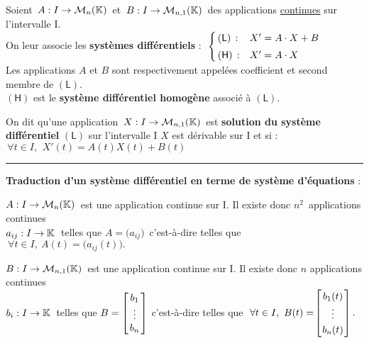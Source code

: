 \vspace{1.7cm}

Soient \(\,A:I\to \mathcal{M}_n(\mathbb{K})\,\) et \(\,B:I\to \mathcal{M}_{n,1}(\mathbb{K})\,\) des applications \underline{continues} sur l'intervalle I.\vspace{0.3cm}\\
On leur associe les \textbf{systèmes différentiels} : \(\ \left\{\!\! 
\begin{array}{ll}
    (\mathsf{L})\,: & X'=A\cdot X+B\vspace{0.1cm}\\
    (\mathsf{H})\,: & X'=A\cdot X
\end{array}\right.\)\vspace{0.4cm}\\
Les applications $A$ et $B$ sont respectivement appelées coefficient et second membre de $(\mathsf{L})$.\\
$(\mathsf{H})$ est le \textbf{système différentiel homogène} associé à $(\mathsf{L})$.

\vspace{1.2cm}

On dit qu'une application \(\,X:I\to \mathcal{M}_{n,1}(\mathbb{K})\,\) est \textbf{solution du système différentiel} \((\mathsf{L})\) sur l'intervalle I \ssi $X$ est dérivable sur I et si : \(\, \forall t\in I,\ \, X'(t)=A(t)X(t)+B(t)\)

\vspace{1.3cm}

\hrule

\vspace{1cm}

\begin{center}
\textbf{Traduction d'un système différentiel en terme de système d'équations} :
\end{center} \vspace{0.7cm}

\(A:I\to \mathcal{M}_n(\mathbb{K})\,\) est une application continue sur I. Il existe donc $n^2\,$ applications continues\\
\(a_{ij}:I\to \mathbb{K} \: \) telles que \(A=\!\bigl(a_{ij}\bigr)\,\) c'est-à-dire telles que \(\ \forall t \in I,\ A(t)=\bigl(a_{ij}(t)\bigr).\)\vspace{1.3cm}

\(B:I\to \mathcal{M}_{n,1}(\mathbb{K})\,\) est une application continue sur I. Il existe donc $n$ applications continues\\
\(b_i:I\to \mathbb{K} \: \) telles que \(B=\arraycolsep=0.05cm\def\arraystretch{1} \left[
\begin{array}{c}
    b_1\\
    \vdots\\
    b_n
\end{array}    
\right]\) c'est-à-dire telles que \(\ \forall t \in I,\ B(t)=\!\arraycolsep=0.03cm\def\arraystretch{1.2}\left[
    \begin{array}{c}
        b_1(t)\\
        \vdots\\
        b_n(t)
    \end{array}    
    \right].\)

